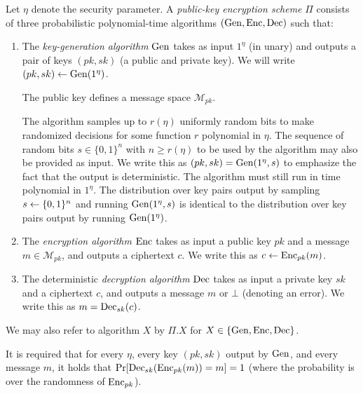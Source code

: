 \begin{definition} \label{def:public-key-encryption}
	Let $\eta$ denote the security parameter.
	A \emph{public-key encryption scheme} $\Pi$ consists of three probabilistic polynomial-time algorithms $(\mathrm{Gen}, \mathrm{Enc}, \mathrm{Dec})$ such that:
	\begin{enumerate}[1.]
		\item The \emph{key-generation algorithm} $\mathrm{Gen}$ takes as input $1^\eta$ (in unary) and outputs a pair of keys $(pk, sk)$ (a public and private key). We will write $(pk, sk) \leftarrow \mathrm{Gen}(1^\eta)$.

		      The public key defines a message space $\mathcal{M}_{pk}$.

		      The algorithm samples up to $r(\eta)$ uniformly random bits to make randomized decisions for some function $r$ polynomial in $\eta$. The sequence of random bits $s \in \{0, 1\}^n$ with $n \ge r(\eta)$ to be used by the algorithm may also be provided as input. We write this as $(pk, sk) = \mathrm{Gen}(1^\eta, s)$ to emphasize the fact that the output is deterministic. The algorithm must still run in time polynomial in $1^\eta$. The distribution over key pairs output by sampling $s \leftarrow \{0, 1\}^n$ and running $\mathrm{Gen}(1^\eta, s)$ is identical to the distribution over key pairs output by running $\mathrm{Gen}(1^\eta)$.


		\item The \emph{encryption algorithm} $\mathrm{Enc}$ takes as input a public key $pk$ and a message $m \in \mathcal{M}_{pk}$, and outputs a ciphertext $c$. We write this as $c \leftarrow \mathrm{Enc}_{pk}(m)$.
		\item The deterministic \emph{decryption algorithm} $\mathrm{Dec}$ takes as input a private key $sk$ and a ciphertext $c$, and outputs a message $m$ or $\bot$ (denoting an error). We write this as $m = \mathrm{Dec}_{sk}(c)$.
	\end{enumerate}

	We may also refer to algorithm $X$ by $\Pi.X$ for $X \in \{\mathrm{Gen}, \mathrm{Enc}, \mathrm{Dec}\}$.

	It is required that for every $\eta$, every key $(pk, sk)$ output by $\mathrm{Gen}$, and every message $m$, it holds that $\pr{\dec_{sk}(\enc_{pk}(m)) = m} = 1$ (where the probability is over the randomness of $\mathrm{Enc}_{pk}$).
\end{definition}

